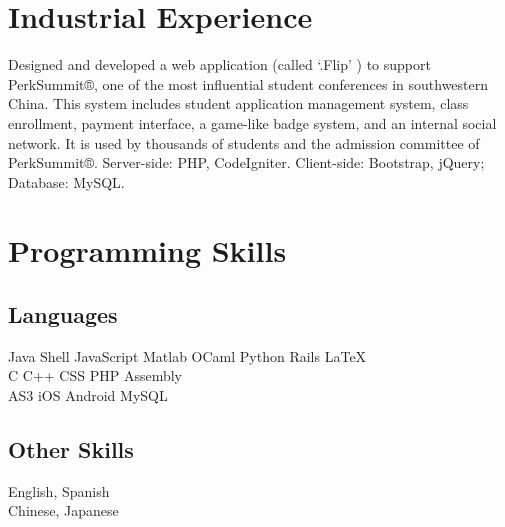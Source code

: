 \documentclass[]{deedy-resume-openfont}
\begin{document}

\section{Industrial Experience}
Designed and developed a web application (called ‘.Flip’ ) to support PerkSummit®, one of the most influential student conferences in southwestern China.
This system includes student application management system, class enrollment, payment interface, a game-like badge system, and an internal social network.
It is used by thousands of students and the admission committee of PerkSummit®.
Server-side: PHP, CodeIgniter. Client-side: Bootstrap, jQuery; Database: MySQL.
\sectionsep


\section{Programming Skills}
\begin{minipage}[t]{.6\textwidth}
\subsection{Languages}
Java \textbullet{}   Shell \textbullet{} JavaScript \textbullet{} Matlab \textbullet{}
OCaml \textbullet{} Python \textbullet{} Rails \textbullet{} \LaTeX\ \\ 
C \textbullet{} C++ \textbullet{} CSS \textbullet{} PHP \textbullet{} Assembly \\
AS3 \textbullet{} iOS \textbullet{} Android \textbullet{} MySQL
\sectionsep
\end{minipage}
\hfill
\begin{minipage}[t]{.35\textwidth}
\subsection{Other Skills}
 English, Spanish\\
 Chinese, Japanese\\
\end{minipage}

\end{document}
